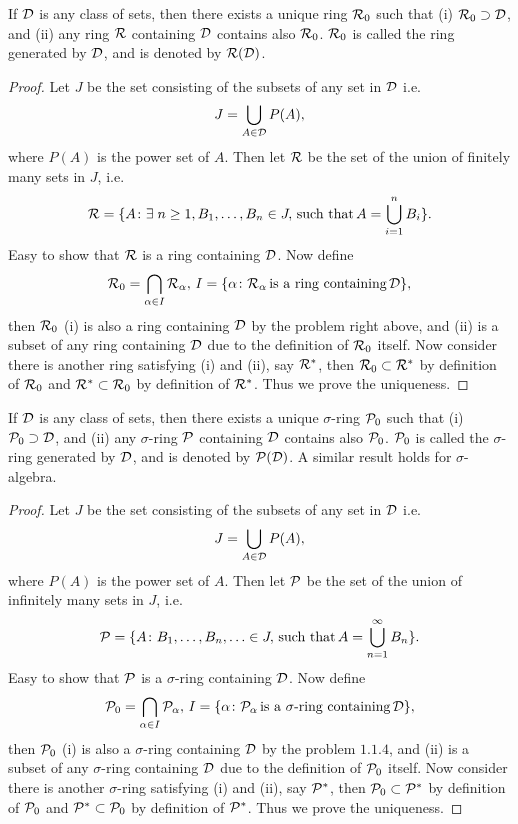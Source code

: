 \begin{pro}%
	If $\mathcal{D}$ is any class of sets, then there exists a unique ring $\mathcal{R}_0$ such that (i) $\mathcal{R}_0\supset \mathcal{D}$, and (ii) any ring $\mathcal{R}$ containing $\mathcal{D}$ contains also $\mathcal{R}_0$. $\mathcal{R}_0$ is called the ring generated by $\mathcal{D}$, and is denoted by $\mathcal{R}(\mathcal{D})$.
\end{pro}
\begin{proof}
	Let $J$ be the set consisting of the subsets of any set in $\mathcal{D}$ i.e.
	\[J=\bigcup_{A\in\mathcal{D}}P(A),\]
	where $P(A)$ is the power set of $A$. Then let $\mathcal{R}$ be the set of the union of finitely many sets in $J$, i.e. 
	\[\mathcal{R}=\{A\colon \exists\;n\geq 1, B_1,\dots,B_n\in J,\,\mbox{such that} \,A=\bigcup_{i=1}^n B_i\}.\]
	Easy to show that $\mathcal{R}$ is a ring containing $\mathcal{D}$. Now define
	\[\mathcal{R}_0=\bigcap_{\alpha \in I} \mathcal{R}_{\alpha},\, I=\{\alpha\colon \mathcal{R}_{\alpha}\,\mbox{is a ring containing}\,\mathcal{D}\},\]
	then $\mathcal{R}_0$ (i) is also a ring containing $\mathcal{D}$ by the problem right above, and (ii) is a subset of any ring containing $\mathcal{D}$ due to the definition of $\mathcal{R}_0$ itself. Now consider there is another ring satisfying (i) and (ii), say $\mathcal{R}^*$, then $\mathcal{R}_0\subset \mathcal{R}^*$ by definition of $\mathcal{R}_0$ and $\mathcal{R}^*\subset \mathcal{R}_0$ by definition of $\mathcal{R}^*$. Thus we prove the uniqueness.
\end{proof}

\begin{pro}%
	If $\mathcal{D}$ is any class of sets, then there exists a unique $\sigma$-ring $\mathcal{P}_0$ such that (i) $\mathcal{P}_0\supset\mathcal{D}$, and (ii) any $\sigma$-ring $\mathcal{P}$ containing $\mathcal{D}$ contains also $\mathcal{P}_0$. $\mathcal{P}_0$ is called the $\sigma$-ring generated by $\mathcal{D}$, and is denoted by $\mathcal{P}(\mathcal{D})$. A similar result holds for $\sigma$-algebra.
\end{pro}
\begin{proof}
	Let $J$ be the set consisting of the subsets of any set in $\mathcal{D}$ i.e.
	\[J=\bigcup_{A\in\mathcal{D}}P(A),\]
	where $P(A)$ is the power set of $A$. Then let $\mathcal{P}$ be the set of the union of infinitely many sets in $J$, i.e. 
	\[\mathcal{P}=\{A\colon B_1,\dots,B_n,\ldots\in J,\,\mbox{such that} \,A=\bigcup_{n=1}^\infty B_n\}.\]
	Easy to show that $\mathcal{P}$ is a $\sigma$-ring containing $\mathcal{D}$. Now define
	\[\mathcal{P}_0=\bigcap_{\alpha \in I} \mathcal{P}_{\alpha},\, I=\{\alpha\colon \mathcal{P}_{\alpha}\,\mbox{is a $\sigma$-ring containing}\,\mathcal{D}\},\]
	then $\mathcal{P}_0$ (i) is also a $\sigma$-ring containing $\mathcal{D}$ by the problem $1.1.4$, and (ii) is a subset of any $\sigma$-ring containing $\mathcal{D}$ due to the definition of $\mathcal{P}_0$ itself. Now consider there is another $\sigma$-ring satisfying (i) and (ii), say $\mathcal{P}^*$, then $\mathcal{P}_0\subset \mathcal{P}^*$ by definition of $\mathcal{P}_0$ and $\mathcal{P}^*\subset \mathcal{P}_0$ by definition of $\mathcal{P}^*$. Thus we prove the uniqueness.
\end{proof}

